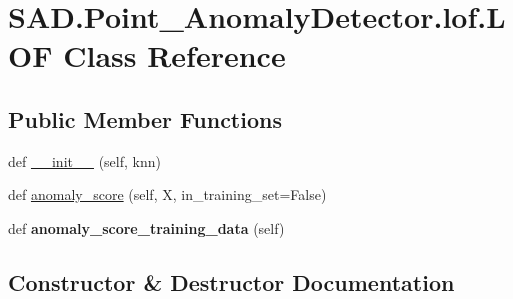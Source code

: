 \hypertarget{classSAD_1_1Point__AnomalyDetector_1_1lof_1_1LOF}{}\section{S\+A\+D.\+Point\+\_\+\+Anomaly\+Detector.\+lof.\+L\+OF Class Reference}
\label{classSAD_1_1Point__AnomalyDetector_1_1lof_1_1LOF}
\subsection*{Public Member Functions}
\begin{DoxyCompactItemize}
\item 
def \hyperlink{classSAD_1_1Point__AnomalyDetector_1_1lof_1_1LOF_a69d2963f6872ad3ad242de18d6e13e02}{\+\_\+\+\_\+init\+\_\+\+\_\+} (self, knn)
\item 
def \hyperlink{classSAD_1_1Point__AnomalyDetector_1_1lof_1_1LOF_a1ef7844074fc0eba2712ea9c936f78f0}{anomaly\+\_\+score} (self, X, in\+\_\+training\+\_\+set=False)
\item 
def {\bfseries anomaly\+\_\+score\+\_\+training\+\_\+data} (self)\hypertarget{classSAD_1_1Point__AnomalyDetector_1_1lof_1_1LOF_a900133981aa14fe76708e11ceb845b9e}{}\label{classSAD_1_1Point__AnomalyDetector_1_1lof_1_1LOF_a900133981aa14fe76708e11ceb845b9e}

\end{DoxyCompactItemize}


\subsection{Constructor \& Destructor Documentation}
